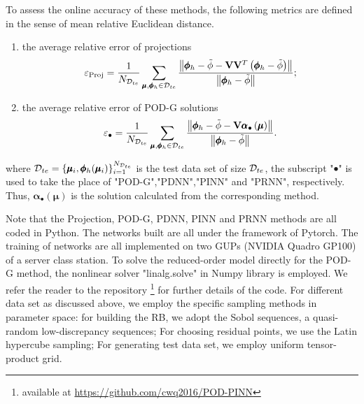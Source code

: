 \documentclass[preprint, 10pt]{elsarticle}
\begin{document}
To assess the online accuracy of these methods, the following metrics are defined in the sense of mean relative Euclidean distance.
\begin{enumerate}[(1)]
\item the average relative error of  projections
\begin{equation}
\varepsilon_{\rm{Proj}}
=\frac{1}{N_{{\cal D}_{te}}}
\sum\limits_{\pmb\mu ,\pmb{\phi}_h  \in {{\cal D}_{te}}}{
\frac{\left\| \pmb{\phi}_h - \tilde{\phi} -\mathbf{V}\mathbf{V}^T \left( \pmb{\phi}_h - \tilde{\phi} \right)  \right\|}
{\left\| \pmb{\phi}_h  - \tilde{\phi} \right\|}
};
\end{equation}

\item the average relative error of POD-G solutions
\begin{equation}
\varepsilon_{\bullet}
=\frac{1}{N_{{\cal D}_{te}}}
\sum\limits_{\pmb\mu ,\pmb{\phi}_h  \in {{\cal D}_{te}}}{
\frac{\left\| \pmb{\phi}_h- \tilde{\phi}-\mathbf{V}\pmb{\alpha}_{\bullet}\left( \pmb{\mu}\right)
\right\|}
{\left\| \pmb{\phi}_h - \tilde{\phi} \right\|}
}.
\end{equation}

\end{enumerate}
where ${{\cal D}_{te}}=\{\pmb{\mu}_i, \pmb{\phi}_h(\pmb{\mu}_i)\}_{i=1}^{N_{{\cal D}_{te}}}$ is the test data set of size ${{\cal D}_{te}}$, the subscript "$\bullet$" is used to take the place of "POD-G","PDNN","PINN" and "PRNN", respectively. Thus, $\pmb{\alpha}_{\bullet}\left( \pmb{\mu}\right)$ is the solution calculated from the corresponding method.

Note that the Projection, POD-G, PDNN, PINN and PRNN methods are all coded in Python. The networks built are all under the framework of Pytorch. The training of networks are all  implemented on two GUPs (NVIDIA Quadro GP100) of a server class station. To solve the reduced-order model directly for the POD-G method, the nonlinear solver "linalg.solve" in  Numpy library is employed. We refer the reader to the repository \footnote{available at \url{https://github.com/cwq2016/POD-PINN}} for further details of the code. For different data set as discussed above, we employ the specific sampling methods in parameter space: for building the RB, we adopt the Sobol sequences, a quasi-random low-discrepancy sequences; For choosing residual points, we use the Latin hypercube sampling; For generating test data set, we employ uniform tensor-product grid.
\end{document}
